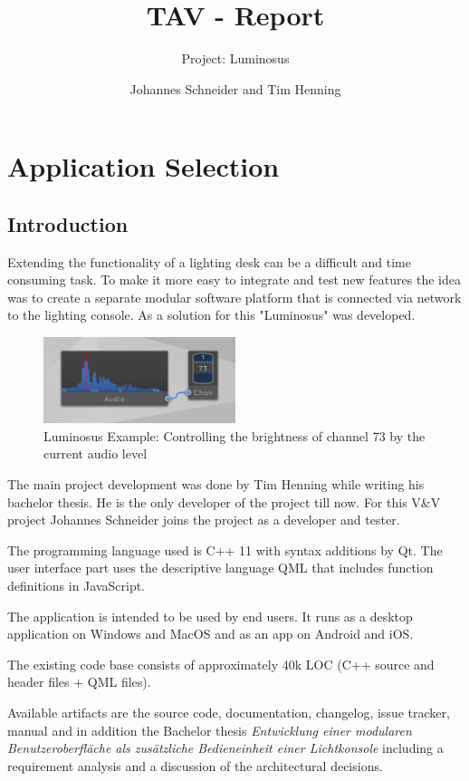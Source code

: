 \documentclass{scrartcl}
\title{TAV - Report}
\subtitle{Project: Luminosus}
\author{Johannes Schneider and Tim Henning}
\begin{document}
\maketitle

\setcounter{section}{-1}
\section{Application Selection}

\subsection{Introduction}

Extending the functionality of a lighting desk can be a difficult and time consuming task. To make it more easy to integrate and test new features the idea was to create a separate modular software platform that is connected via network to the lighting console. As a solution for this "Luminosus" was developed.

\begin{figure}[h]
	\centering
	\includegraphics[width=0.5\textwidth]{img/luminosus_example}
	\caption[Luminosus Example]{Luminosus Example: Controlling the brightness of channel 73 by the current audio level}
	\label{fig:luminosus_example}
\end{figure}

The main project development was done by Tim Henning while writing his bachelor thesis. He is the only developer of the project till now. For this V\&V project Johannes Schneider joins the project as a developer and tester.

The programming language used is C++ 11 with syntax additions by Qt. The user interface part uses the descriptive language QML that includes function definitions in JavaScript.

The application is intended to be used by end users. It runs as a desktop application on Windows and MacOS and as an app on Android and iOS.

The existing code base consists of approximately 40k LOC (C++ source and header files + QML files).

Available artifacts are the source code, documentation, changelog, issue tracker, manual and in addition the Bachelor thesis \textit{Entwicklung einer modularen Benutzeroberfl\"ache als zus\"atzliche Bedieneinheit einer Lichtkonsole} including a requirement analysis and a discussion of the architectural decisions.
\end{document}
